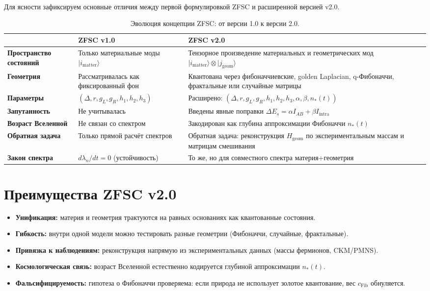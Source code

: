 \documentclass[12pt,a4paper]{article}
\begin{document}
Для ясности зафиксируем основные отличия между первой формулировкой ZFSC и расширенной версией v2.0.
\begin{table}[h!]
\centering
\begin{tabular}{@{}p{4cm}p{5.5cm}p{5.5cm}@{}}
\toprule
 & \textbf{ZFSC v1.0} & \textbf{ZFSC v2.0} \\
\midrule
\textbf{Пространство состояний} & Только материальные моды $|i_{\mathrm{matter}}\rangle$ & Тензорное произведение материальных и геометрических мод $|i_{\mathrm{matter}}\rangle \otimes |j_{\mathrm{geom}}\rangle$ \\
\textbf{Геометрия} & Рассматривалась как фиксированный фон & Квантована через фибоначчиевские, golden Laplacian, q-Фибоначчи, фрактальные или случайные матрицы \\
\textbf{Параметры} & $(\Delta, r, g_L, g_R, h_1,h_2,h_3)$ & Расширено: $(\Delta, r, g_L, g_R, h_1,h_2,h_3, \alpha, \beta, n_*(t))$ \\
\textbf{Запутанность} & Не учитывалась & Введены явные поправки $\Delta E_s = \alpha I_{AB} + \beta I_{\mathrm{intra}}$ \\
\textbf{Возраст Вселенной} & Не связан со спектром & Закодирован как глубина аппроксимации Фибоначчи $n_*(t)$ \\
\textbf{Обратная задача} & Только прямой расчёт спектров & Обратная задача: реконструкция $H_{\mathrm{geom}}$ по экспериментальным массам и матрицам смешивания \\
\textbf{Закон спектра} & $d\lambda_n/dt = 0$ (устойчивость) & То же, но для совместного спектра материя+геометрия \\
\bottomrule
\end{tabular}
\caption{Эволюция концепции ZFSC: от версии 1.0 к версии 2.0.}
\end{table}

\section{Преимущества ZFSC v2.0}
\begin{itemize}
    \item \textbf{Унификация:} материя и геометрия трактуются на равных основаниях как квантованные состояния.  
    \item \textbf{Гибкость:} внутри одной модели можно тестировать разные геометрии (Фибоначчи, случайные, фрактальные).  
    \item \textbf{Привязка к наблюдениям:} реконструкция напрямую из экспериментальных данных (массы фермионов, CKM/PMNS).  
    \item \textbf{Космологическая связь:} возраст Вселенной естественно кодируется глубиной аппроксимации $n_*(t)$.  
    \item \textbf{Фальсифицируемость:} гипотеза о Фибоначчи проверяема: если природа не использует золотое квантование, вес $c_{\mathrm{Fib}}$ обнуляется.  
\end{itemize}
\end{document}
